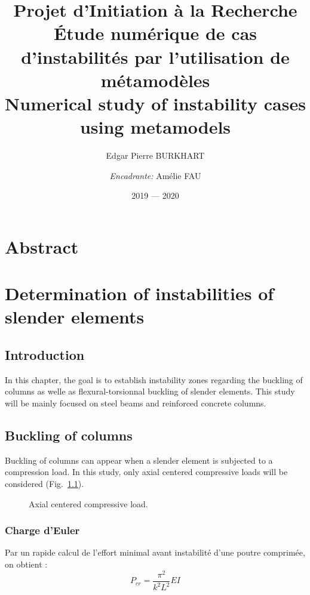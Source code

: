 \documentclass{report}
\title{{\small Projet d'Initiation à la Recherche}\\Étude numérique de cas d'instabilités par l'utilisation de métamodèles\\Numerical study of instability cases using metamodels}
\author{Edgar Pierre BURKHART\and\textit{Encadrante:} Amélie FAU}
\date{2019 --- 2020}
\begin{document}
\maketitle

\chapter*{Abstract}

\tableofcontents

\chapter{Determination of instabilities of slender elements}
\section{Introduction}
In this chapter, the goal is to establish instability zones regarding the buckling of columns as welle as flexural-torsionnal buckling of slender elements.
This study will be mainly focused on steel beams and reinforced concrete columns.

\section{Buckling of columns}
Buckling of columns can appear when a slender element is subjected to a compression load.
In this study, only axial centered compressive loads will be considered (Fig.~\ref{fig:flamb}).

\begin{figure}
    \centering
    \caption{Axial centered compressive load.}\label{fig:flamb}
\end{figure}

\subsection{Charge d'Euler}
Par un rapide calcul de l'effort minimal avant instabilité d'une poutre comprimée, on obtient \cite{coursfla}:
\begin{dmath}
    P_{cr}=\frac{\pi^2}{k^2L^2}EI
\end{dmath}
\end{document}
